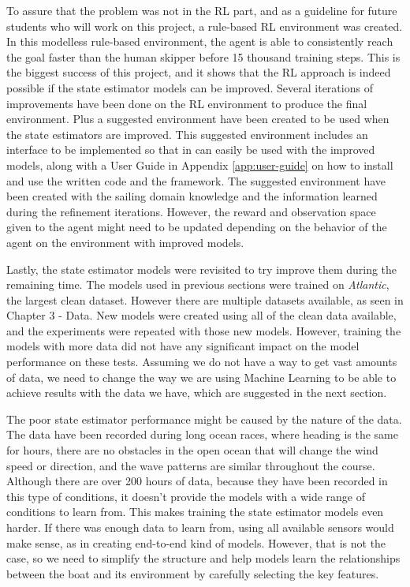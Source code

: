 \documentclass[12pt,twoside]{report}
\begin{document}
To assure that the problem was not in the RL part, and as a guideline for future students who will work on this project, a rule-based RL environment was created. In this modelless rule-based environment, the agent is able to consistently reach the goal faster than the human skipper before 15 thousand training steps. This is the biggest success of this project, and it shows that the RL approach is indeed possible if the state estimator models can be improved. Several iterations of improvements have been done on the RL environment to produce the final environment. Plus a suggested environment have been created to be used when the state estimators are improved. This suggested environment includes an interface to be implemented so that in can easily be used with the improved models, along with a User Guide in Appendix \ref{app:user-guide} on how to install and use the written code and the framework. The suggested environment have been created with the sailing domain knowledge and the information learned during the refinement iterations. However, the reward and observation space given to the agent might need to be updated depending on the behavior of the agent on the environment with improved models.

Lastly, the state estimator models were revisited to try improve them during the remaining time. The models used in previous sections were trained on \textit{Atlantic}, the largest clean dataset. However there are multiple datasets available, as seen in Chapter 3 - Data. New models were created using all of the clean data available, and the experiments were repeated with those new models. However, training the models with more data did not have any significant impact on the model performance on these tests. Assuming we do not have a way to get vast amounts of data, we need to change the way we are using Machine Learning to be able to achieve results with the data we have, which are suggested in the next section.

The poor state estimator performance might be caused by the nature of the data. The data have been recorded during long ocean races, where heading is the same for hours, there are no obstacles in the open ocean that will change the wind speed or direction, and the wave patterns are similar throughout the course. Although there are over 200 hours of data, because they have been recorded in this type of conditions, it doesn't provide the models with a wide range of conditions to learn from. This makes training the state estimator models even harder. If there was enough data to learn from, using all available sensors would make sense, as in creating end-to-end kind of models. However, that is not the case, so we need to simplify the structure and help models learn the relationships between the boat and its environment by carefully selecting the key features.
\end{document}
